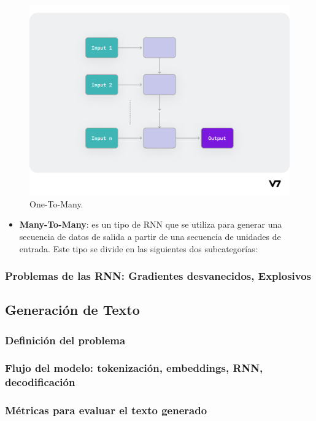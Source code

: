 \documentclass{article}
\begin{document}
\begin{figure}[H]
    \centering
    \includegraphics[scale=0.25]{mto.png}
    \caption{One-To-Many.}
\end{figure}

\newpage

\begin{itemize}
    \item \textbf{Many-To-Many}: es un tipo de RNN que se utiliza para generar una secuencia de datos de salida a partir de una secuencia de unidades de entrada. Este tipo se divide en las siguientes dos subcategorías:
\end{itemize}



\newpage
\subsubsection{Problemas de las RNN: Gradientes desvanecidos, Explosivos}

\subsection{Generación de Texto}
\subsubsection{Definición del problema}
\subsubsection{Flujo del modelo: tokenización, embeddings, RNN, decodificación}
\subsubsection{Métricas para evaluar el texto generado}
\end{document}
